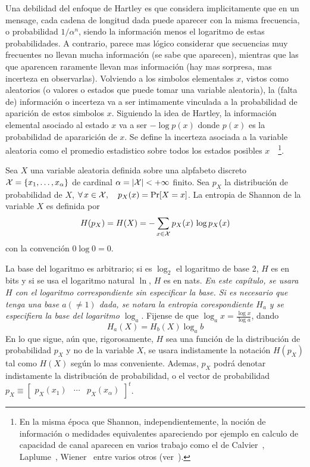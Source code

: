 Una debilidad del  enfoque de Hartley es que considera  implicitamente que en un
mensage, cada cadena de longitud dada  puede aparecer con la misma frecuencia, o
probabilidad $1/\alpha^n$,  siendo la informaci\'on menos el  logaritmo de estas
probabilidades.  A contrario, parece  mas l\'ogico considerar que secuencias muy
frecuentes no  llevan mucha informaci\'on  (se sabe que aparecen),  mientras que
las  que aparencen  raramente llevan  mas informaci\'on  (hay mas  sorpresa, mas
incerteza  en observarlas).  Volviendo  a los  simbolos elementales  $x$, vistos
como aleatorios (o valores o estados que puede tomar una variable aleatoria), la
(falta  de)  informaci\'on o  incerteza  va a  ser  intimamente  vinculada a  la
probabilidad de aparici\'on de estos simbolos $x$. Siguiendo la idea de Hartley,
la informaci\'on elemental  asociado al estado $x$ va a ser  $- \log p(x)$ donde
$p(x)$  es la  probabilidad de  apararici\'on de  $x$.  Se  define  la incerteza
asociada a  la variable aleatoria como  el promedio estadistico  sobre todos los
estados  posibles $x$~\cite{Sha48, ShaWea64}~\footnote{En  la misma  \'epoca que
  Shannon,  independientemente,   la  noci\'on  de   informaci\'on  o  medidades
  equivalentes apareciendo por ejemplo en calculo de capacidad de canal aparecen
  en  varios  trabajo  como  el de  Calvier~\cite{Cla48},  Laplume~\cite{Lap48},
  Wiener~\cite[Cap.~III]{Wie48}  entre  varios  otros  (ver~\cite{Ver98,  Lun02,
    RioMag14, FlaRio16, RioFla17, Che17}).}.
%
\begin{definicion}\label{def:SZ:Shannon}
  Sea $X$ una variable aleatoria definida  sobre una alpfabeto discreto $\mathcal{X} = \{
  x_1 , \ldots , x_\alpha \}$ de cardinal $\alpha = |\mathcal{X}| < + \infty$ finito. Sea
  $p_X$ la  distribuci\'on de probabilidad  de $X$, \ie  $ \forall \, x  \in \mathcal{X},
  \quad p_X(x)  = \Pr[X  = x]$.  La entropia de  Shannon de  la variable  $X$ es
  definida por
  \[
    H(p_X) = H(X) = - \sum_{x \in \mathcal{X}} p_X(x) \, \log p_X(x)
  \]
  con la convenci\'on $0 \log 0 = 0$.
\end{definicion}

La base del logaritmo es arbitrario; si  es $\log_2$ el logaritmo de base 2, $H$
es en bits y si se usa el logaritmo natural $\ln$, $H$ es en nats.  {\it En este
  cap\'itulo, se usara  $H$ con el logaritmo correspondiente  sin especificar la
  base.  Si  es necesario  que tenga  una base $a  (\ne 1)$  dada, se  notara la
  entropia  corespondiente  $H_a$  y   se  especifiera  la  base  del  logaritmo
  $\log_a$}.  Fijense de que $\log_a x = \frac{\log x}{\log a}$, dando
%
\[
H_a(X)  =  H_b(X)  \log_a b
\]
%
En  lo  que  sigue, a\'un  que,  rigorosamente,  $H$  sea  una funci\'on  de  la
distribuci\'on  de  probabilidad  $p_X$  y  no  de la  variable  $X$,  se  usara
indistamente la notaci\'on $H(p_X)$ tal  como $H(X)$ seg\'un lo mas conveniente.
Ademas, $p_X$ podr\'a denotar  indistamente la distribuci\'on de probabilidad, o
el  vector  de probabilidad  $p_X  \equiv  \begin{bmatrix}  p_X(x_1) &  \cdots  &
  p_X(x_\alpha) \end{bmatrix}^t$.

